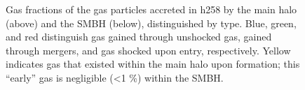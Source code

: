 \documentclass[manuscript]{aastex}
\begin{document}
\begin{figure}
\centerline{}
\centerline{}
\caption[]{Gas fractions of the gas particles accreted in h258 by the main halo (above) and the SMBH (below), distinguished by type. Blue, green, and red distinguish gas gained through unshocked gas, gained through mergers, and gas shocked upon entry, respectively. Yellow indicates gas that existed within the main halo upon formation; this ``early'' gas is negligible (<1 \%) within the SMBH.}
\label{h258piefrac} 
\end{figure}
\end{document}
